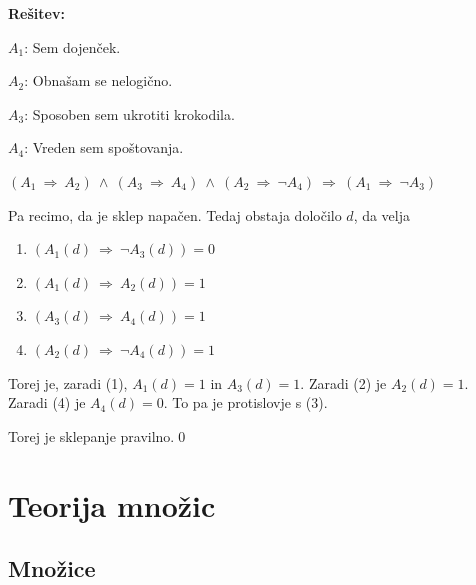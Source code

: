 \documentclass[11pt,paper=b5,footinclude,headinclude]{scrbook} %
\def\ali {{~\vee~}}
\def\inn {{~\wedge~}}
\def\sledi {{~\Rightarrow~}}
\begin{document}
\textbf{Rešitev:}

$A_1$: Sem dojenček.

$A_2$: Obnašam se nelogično.

$A_3$: Sposoben sem ukrotiti krokodila.

$A_4$: Vreden sem spoštovanja.

$(A_1\sledi A_2)\inn (A_3\sledi A_4) \inn (A_2\sledi \neg A_4)\sledi (A_1\sledi \neg A_3)$

Pa recimo, da je sklep napačen. Tedaj obstaja določilo $d$, da velja
\begin{enumerate}[(1)]
  \item $(A_1(d)\sledi \neg A_3(d)) = 0$
  \item $(A_1(d)\sledi A_2(d)) = 1$
  \item $(A_3(d)\sledi A_4(d)) = 1$
  \item $(A_2(d)\sledi \neg A_4(d)) = 1$
\end{enumerate}
Torej je, zaradi (1), $A_1(d) = 1$ in $A_3(d) = 1$. Zaradi (2) je $A_2(d) = 1$.
Zaradi (4) je $A_4(d) = 0$. To pa je protislovje s (3).

Torej je sklepanje pravilno.\qed


%
%
%
%
%
%
%
%
%
%
%
%
%
%
%
%
%
%
%
%
%
%
%
%
%
%
%
\newpage
\chapter{Teorija množic}

\section{Množice}
\end{document}
